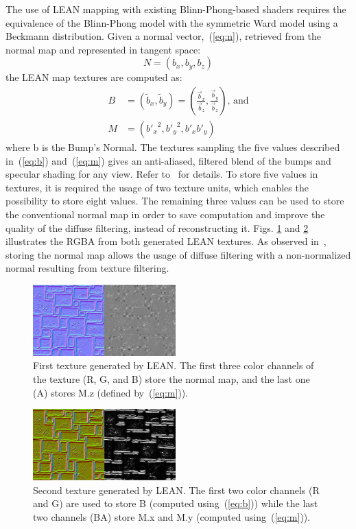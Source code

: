 \documentclass[10pt, conference]{IEEEtran}
\begin{document}
The use of LEAN mapping with existing Blinn-Phong-based shaders requires the equivalence of the Blinn-Phong model with the symmetric Ward model using a Beckmann distribution. Given a normal vector,~(\ref{eq:n}), retrieved from the normal map and represented in tangent space:
\begin{equation}
	\label{eq:n}
	N = (b_{x}, b_{y}, b_{z})
\end{equation}
the LEAN map textures are computed as:
\begin{align}
	\label{eq:b}
	B &= (\tilde{b}_{x}, \tilde{b}_{y}) = \left(\frac{\vec{b}_{x}}{\vec{b}_{z}}, \frac{\vec{b}_{y}}{\vec{b}_{z}}\right) \text{, and}\\
	\label{eq:m}
	M &= ({b'_{x}}^{2}, {b'_{y}}^{2}, b'_{x}b'_{y})
\end{align}
where b is the Bump's Normal. The textures sampling the five values described in~(\ref{eq:b}) and~(\ref{eq:m}) gives an anti-aliased, filtered blend of the bumps and specular shading for any view. Refer to~\cite{Olano:2010:LM:1730804.1730834} for details. To store five values in textures, it is required the usage of two texture units, which enables the possibility to store eight values. The remaining three values can be used to store the conventional normal map in order to save computation and improve the quality of the diffuse filtering, instead of reconstructing it. Figs. \ref{fig:Lean1} and \ref{fig:Lean2} illustrates the RGBA from both generated LEAN textures. As observed in~\cite{Kilgard00apractical}, storing the normal map allows the usage of diffuse filtering with a non-normalized normal resulting from texture filtering.

\begin{figure}[here]
	\includegraphics[width=0.49\textwidth]{figs/Lean1.png}
	\caption{First texture generated by LEAN. The first three color channels of the texture (R, G, and B) store the normal map, and the last one (A) stores M.z (defined by~(\ref{eq:m})).}
	\label{fig:Lean1}
\end{figure}

\begin{figure}[here]
	\includegraphics[width=0.49\textwidth]{figs/Lean2.png}
	\caption{Second texture generated by LEAN. The first two color channels (R and G) are used to store B (computed using~(\ref{eq:b})) while the last two channels (BA) store M.x and M.y (computed using~(\ref{eq:m})).}
	\label{fig:Lean2}
\end{figure}
\end{document}
